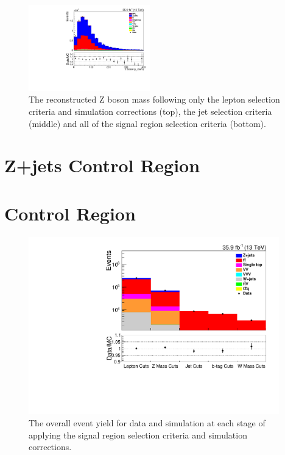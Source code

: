 \begin{figure}[h]
\includegraphics[width=0.47\textwidth]{figs/background-estimation/plots/unblinded/prompt_mumu_ttbarInc/zPairPt_NPL_mumu_wMass_mumu.pdf}
\caption{
The reconstructed Z boson mass \pT following only the lepton selection criteria and simulation corrections (top), the jet selection criteria (middle) and all of the signal region selection criteria (bottom).
}
\label{fig:SR_zBosonPt}
\end{figure}

\clearpage
\newpage	

\section{Z+jets Control Region}\label{appSec:signalRegionPlots}

\clearpage
\newpage
\section{\ttbar Control Region}\label{appSec:signalRegionPlots}

\begin{figure}[!h]
\centering
\includegraphics[width=0.97\textwidth]{figs/background-estimation/plots/unblinded/ttbar_control/cutFlow_log.pdf}
\caption{
The overall event yield for data and simulation at each stage of applying the signal region selection criteria and simulation corrections.
}
\label{fig:ttbar_cutFlow}
\end{figure}

